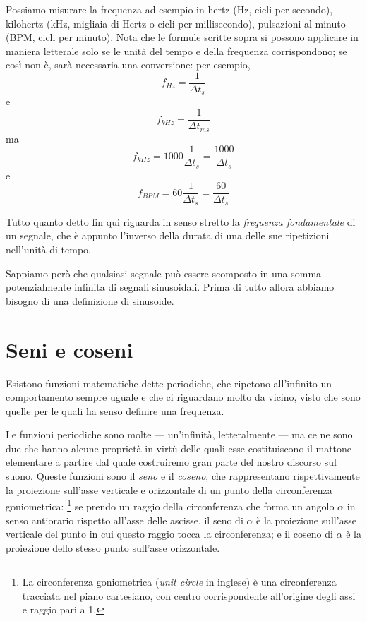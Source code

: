 \documentclass[11pt]{report}
\begin{document}
Possiamo misurare la frequenza ad esempio in hertz (Hz, cicli per secondo), kilohertz (kHz, migliaia di Hertz o cicli per millisecondo), pulsazioni al minuto (BPM, cicli per minuto). Nota che le formule scritte sopra si possono applicare in maniera letterale solo se le unità del tempo e della frequenza corrispondono; se così non è, sarà necessaria una conversione: per esempio,
\begin{equation}
f_{Hz} = \frac{1}{\Delta t_{s}}
\end{equation}
e
\begin{equation}
f_{kHz} = \frac{1}{\Delta t_{ms}}
\end{equation}
ma
\begin{equation}
f_{kHz} = 1000\frac{1}{\Delta t_{s}} = \frac{1000}{\Delta t_{s}}
\end{equation}
e
\begin{equation}
f_{BPM} = 60\frac{1}{\Delta t_{s}} = \frac{60}{\Delta t_{s}}
\end{equation}

Tutto quanto detto fin qui riguarda in senso stretto la \emph{frequenza fondamentale} di un segnale, che è appunto l'inverso della durata di una delle sue ripetizioni nell'unità di tempo.

Sappiamo però che qualsiasi segnale può essere scomposto in una somma potenzialmente infinita di segnali sinusoidali. Prima di tutto allora abbiamo bisogno di una definizione di sinusoide.


\section{Seni e coseni}

Esistono funzioni matematiche dette periodiche, che ripetono all'infinito un comportamento sempre uguale e che ci riguardano molto da vicino, visto che sono quelle per le quali ha senso definire una frequenza.

Le funzioni periodiche sono molte --- un'infinità, letteralmente --- ma ce ne sono due che hanno alcune proprietà in virtù delle quali esse costituiscono il mattone elementare a partire dal quale costruiremo gran parte del nostro discorso sul suono. Queste funzioni sono il \emph{seno} e il \emph{coseno}, che rappresentano rispettivamente la proiezione sull'asse verticale e orizzontale di un punto della circonferenza goniometrica:%
\footnote{La circonferenza goniometrica (\emph{unit circle} in inglese) è una circonferenza tracciata nel piano cartesiano, con centro corrispondente all'origine degli assi e raggio pari a 1.}
se prendo un raggio della circonferenza che forma un angolo $\alpha$ in senso antiorario rispetto all'asse delle ascisse, il seno di $\alpha$ è la proiezione sull'asse verticale del punto in cui questo raggio tocca la circonferenza; e il coseno di $\alpha$ è la proiezione dello stesso punto sull'asse orizzontale.
\end{document}
